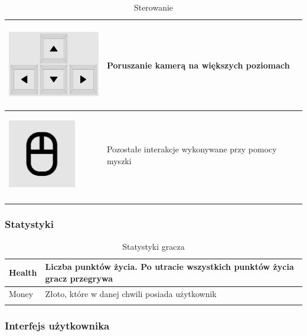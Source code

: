 \documentclass[a4paper,12pt, twoside, titlepage]{article}
\begin{document}
\begin{center}
\begin{longtable}{| p{} | p{} |} 
	\hline
	\begin{center}
		\includegraphics[height=3cm]{import/arrows.pdf}
	\end{center} 
	& Poruszanie kamerą na większych poziomach \\ 
	\hline 
	
	\begin{center}
		\includegraphics[height=3cm]{import/mouse.pdf}
	\end{center}  & Pozostałe interakcje wykonywane przy pomocy myszki \\ 
	\hline
	

	\caption{Sterowanie}	
\end{longtable}
\end{center}

\subsubsection{Statystyki}
\begin{center}
\begin{longtable}{| p{} | p{} |} 
	\hline
	Health
	& Liczba punktów życia. Po utracie wszystkich punktów życia gracz przegrywa \\
	\hline
	Money
	& Złoto, które w danej chwili posiada użytkownik \\ 
	\hline 

	\caption{Statystyki gracza}	
\end{longtable}
\end{center}

\subsubsection{Interfejs użytkownika}
\end{document}
